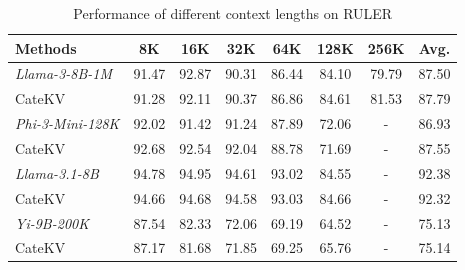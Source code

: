 \begin{table}[h]
\centering
\caption{Performance of different context lengths on RULER}
\begin{tabular}{l|cccccc|c}
\toprule
Methods & 8K& 16K& 32K & 64K & 128K& 256K& Avg.\\ 
\midrule
\textit{Llama-3-8B-1M} & 91.47 & 92.87 & 90.31 & 86.44 & 84.10 & 79.79 & 87.50 \\
CateKV  & 91.28 & 92.11 & 90.37 & 86.86 & 84.61 & 81.53 & 87.79 \\
\midrule
\textit{Phi-3-Mini-128K} & 92.02 & 91.42 & 91.24 & 87.89 & 72.06 & - & 86.93 \\
CateKV  & 92.68 & 92.54 & 92.04 & 88.78 & 71.69 & - & 87.55 \\
\midrule
\textit{Llama-3.1-8B} & 94.78 & 94.95 & 94.61 &  93.02 & 84.55 & - & 92.38\\
CateKV  & 94.66 & 94.68 & 94.58 & 93.03 & 84.66 & - & 92.32 \\
\midrule
\textit{Yi-9B-200K} & 87.54 & 82.33 & 72.06 & 69.19 & 64.52 & - & 75.13 \\
CateKV  & 87.17 & 81.68 & 71.85 & 69.25 & 65.76 & - &  75.14\\
	
\bottomrule
\end{tabular}
\label{tab:ruler8k-256k}
\end{table}
